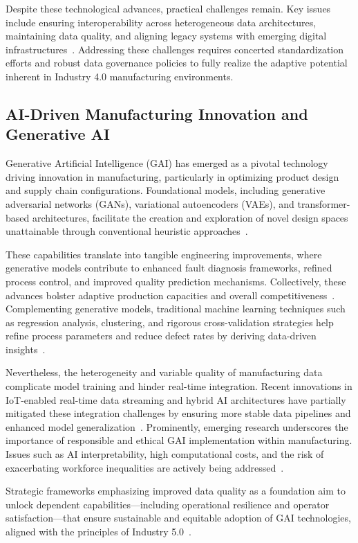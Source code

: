 \documentclass[11pt]{article}
\begin{document}
Despite these technological advances, practical challenges remain. Key issues include ensuring interoperability across heterogeneous data architectures, maintaining data quality, and aligning legacy systems with emerging digital infrastructures~\cite{42}. Addressing these challenges requires concerted standardization efforts and robust data governance policies to fully realize the adaptive potential inherent in Industry 4.0 manufacturing environments.

\subsection{AI-Driven Manufacturing Innovation and Generative AI}

Generative Artificial Intelligence (GAI) has emerged as a pivotal technology driving innovation in manufacturing, particularly in optimizing product design and supply chain configurations. Foundational models, including generative adversarial networks (GANs), variational autoencoders (VAEs), and transformer-based architectures, facilitate the creation and exploration of novel design spaces unattainable through conventional heuristic approaches~\cite{1,8}.  

These capabilities translate into tangible engineering improvements, where generative models contribute to enhanced fault diagnosis frameworks, refined process control, and improved quality prediction mechanisms. Collectively, these advances bolster adaptive production capacities and overall competitiveness~\cite{7,9,36}. Complementing generative models, traditional machine learning techniques such as regression analysis, clustering, and rigorous cross-validation strategies help refine process parameters and reduce defect rates by deriving data-driven insights~\cite{10,13}.  

Nevertheless, the heterogeneity and variable quality of manufacturing data complicate model training and hinder real-time integration. Recent innovations in IoT-enabled real-time data streaming and hybrid AI architectures have partially mitigated these integration challenges by ensuring more stable data pipelines and enhanced model generalization~\cite{20,29}. Prominently, emerging research underscores the importance of responsible and ethical GAI implementation within manufacturing. Issues such as AI interpretability, high computational costs, and the risk of exacerbating workforce inequalities are actively being addressed~\cite{43}.  

Strategic frameworks emphasizing improved data quality as a foundation aim to unlock dependent capabilities—including operational resilience and operator satisfaction—that ensure sustainable and equitable adoption of GAI technologies, aligned with the principles of Industry 5.0~\cite{1}.
\end{document}
